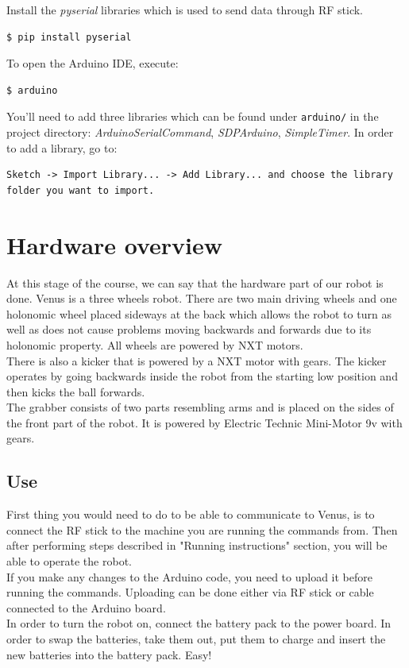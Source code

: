 \documentclass[12pt]{article}
\begin{document}
Install the \textit{pyserial} libraries which is used to send data through RF stick.
\begin{lstlisting}
$ pip install pyserial
\end{lstlisting}

To open the Arduino IDE, execute:
\begin{lstlisting}
$ arduino
\end{lstlisting}

You'll need to add three libraries which can be found under \texttt{arduino/} in the project directory: \textit{ArduinoSerialCommand}, \textit{SDPArduino}, \textit{SimpleTimer}. In order to add a library, go to:
\begin{lstlisting}
Sketch -> Import Library... -> Add Library... and choose the library folder you want to import.
\end{lstlisting}

\section{Hardware overview}

At this stage of the course, we can say that the hardware part of our robot is done. Venus is a three wheels robot. There are two main driving wheels and one holonomic wheel placed sideways at the back which allows the robot to turn as well as does not cause problems moving backwards and forwards due to its holonomic property. All wheels are powered by NXT motors. 
\\There is also a kicker that is powered by a NXT motor with gears. The kicker operates by going backwards inside the robot from the starting low position and then kicks the ball forwards.
\\The grabber consists of two parts resembling arms and is placed on the sides of the front part of the robot. It is powered by Electric Technic Mini-Motor 9v with gears. 

\subsection{Use}

First thing you would need to do to be able to communicate to Venus, is to connect the RF stick to the machine you are running the commands from. Then after performing steps described in "Running instructions" section, you will be able to operate the robot.
\\If you make any changes to the Arduino code, you need to upload it before running the commands. Uploading can be done either via RF stick or cable connected to the Arduino board. 
\\In order to turn the robot on, connect the battery pack to the power board.
In order to swap the batteries, take them out, put them to charge and insert
the new batteries into the battery pack. Easy!
\end{document}
